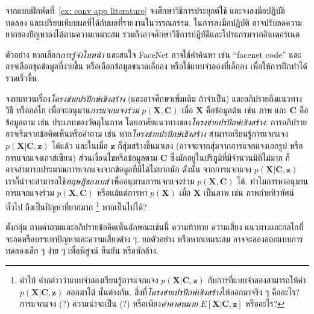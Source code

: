 \begin{Exercise}
	\label{ex: conv app hands-on}
	จากแบบฝึกหัดที่~\ref{ex: conv app literature}
	จงศึกษาวิธีการประยุกต์ใช้ และจงลงมือปฏิบัติ ทดลอง และเปรียบเทียบผลที่ได้กับผลที่รายงานในวรรณกรรม.
%	
	ในการลงมือปฏิบัติ อาจปรับลดความยากของปัญหาลงได้ตามความเหมาะสม 
	รวมถึงอาจศึกษาวิธีการปฎิบัติและโปรแกรมจากอินเตอร์เนต 
	
	ตัวอย่าง หากเลือก\textit{การรู้จำใบหน้า} และสนใจ FaceNet\cite{SchroffEtAl2015}
	อาจใช้คำค้นหา เช่น ``facenet code''
	และอาจเลือกชุดข้อมูลที่ง่ายขึ้น หรือเลือกข้อมูลขนาดเล็กลง หรือใช้แบบจำลองที่เล็กลง เพื่อให้การฝึกทำได้รวดเร็วขึ้น.
		
\end{Exercise}

\begin{Exercise}
	\label{ex: conv app GAN joint prob}
	จงทบทวนเรื่อง\textit{โครงข่ายปรปักษ์เชิงสร้าง}
	(และอาจศึกษาเพิ่มเติม ถ้าจำเป็น)
	และอภิปรายถึงแนวทาง วิธี หรือกลไก เพื่อจะอนุมาน\textit{การแจกแจงร่วม} $p(\bm{X}, \bm{C})$ เมื่อ $\bm{X}$ คือข้อมูลต้น เช่น ภาพ และ $\bm{C}$ คือข้อมูลตาม เช่น ประเภทของวัตถุในภาพ
	โดยอาศัยแนวทางของ\textit{โครงข่ายปรปักษ์เชิงสร้าง}.
	การอภิปราย อาจเริ่มจากข้อคิดเห็นหรือคำถาม 
	เช่น 
	หาก\textit{โครงข่ายปรปักษ์เชิงสร้าง} สามารถเรียนรู้การแจกแจง $p(\bm{X}|\bm{C}, \bm{z})$ ได้แล้ว 
	และในเมื่อ $\bm{z}$ ก็สุ่มสร้างขึ้นมาเอง (อาจจะจากสุ่มจากการแจกแจงเอกรูป หรือการแจกแจงเกาส์เซียน)
	ส่วนเงื่อนไขหรือข้อมูลตาม $\bm{C}$ ซึ่งมักอยู่ในปริภูมิที่มีจำนวนมิติไม่มาก ก็อาจสามารถประมาณการแจกแจงจากข้อมูลที่มีได้ไม่ยากนัก
	ดังนั้น จากการแจกแจง $p(\bm{X}|\bm{C}, \bm{z})$ เราก็น่าจะสามารถใช้\textit{ทฤษฎีของเบส์}
	เพื่ออนุมานการแจกแจงร่วม $p(\bm{X}, \bm{C})$ ได้.
	ทำไมการหาอนุมานการแจกแจงร่วม $p(\bm{X}, \bm{C})$ หรือแม้แต่การหา $p(\bm{X})$ เมื่อ $\bm{X}$ เป็นภาพ เช่น ภาพถ่ายทิวทัศน์ทั่วไป ถึงเป็นปัญหาที่ยากมาก%
	\footnote{
		คำใบ้ คำกล่าวว่าแบบจำลองเรียนรู้การแจกแจง $p(\bm{X}|\bm{C}, \bm{z})$
		กับการที่แบบจำลองสามารถให้ค่า $p(\bm{X}|\bm{C}, \bm{z})$ ออกมาได้ นั้นต่างกัน.
		สิ่งที่\textit{โครงข่ายปรปักษ์เชิงสร้าง}ให้ออกมาจริง ๆ คืออะไร?
		การแจกแจง (?) ความน่าจะเป็น (?) หรือเพียง\textit{ค่าคาดหมาย} $E[\bm{X}|\bm{C}, \bm{z}]$ หรืออะไร?
	}
 หากเป็นไปได้?
	
	ตั้งกลุ่ม ถามคำถามและอภิปรายข้อคิดเห็นลักษณะเช่นนี้ ความท้าทาย ความเสี่ยง แนวทางและกลไกที่จะลดหรือบรรเทาปัญหาและความเสี่ยงต่าง ๆ.
	ยกตัวอย่าง หรือหากเหมาะสม อาจจะลองออกแบบการทดลองเล็ก ๆ ง่าย ๆ เพื่อพิสูจน์ ยืนยัน หรือหักล้าง.
		
\end{Exercise}


